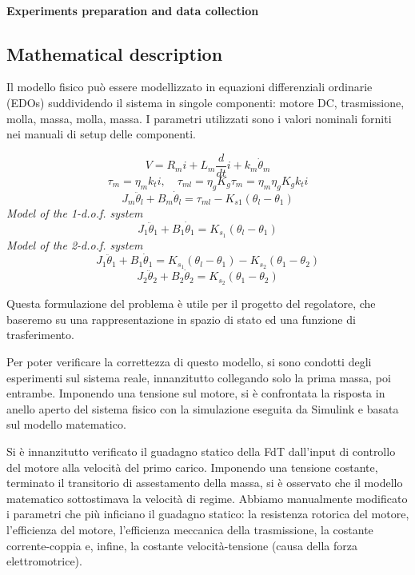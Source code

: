 \paragraph{Experiments preparation and data collection}


\subsection{Mathematical description}

Il modello fisico può essere modellizzato in equazioni differenziali ordinarie (EDOs) suddividendo il sistema in singole componenti: motore DC, trasmissione, molla, massa, molla, massa. I parametri utilizzati sono i valori nominali forniti nei manuali di setup delle componenti.


\[	V = R_m i + L_m \frac{d}{dt}i + k_m \dot{\theta}_m \]
\[ \tau_m = \eta_m k_t i , \quad \tau_{ml} = \eta_g K_g \tau_m = \eta_m \eta_g K_g k_t i \]
\[ J_m \ddot{\theta}_l + B_m \dot{\theta}_l = \tau_{ml} - K_{s1} ( \theta_l - \theta_1 ) \]
\textit{Model of the 1-d.o.f. system}
\[ J_1 \ddot{\theta}_1 + B_1 \dot{\theta}_1 = K_{s_1} ( \theta_l - \theta_1 ) \]
\textit{Model of the 2-d.o.f. system}
\\
\[ J_1 \ddot{\theta}_1 + B_1 \dot{\theta}_1 = K_{s_1} ( \theta_l - \theta_1 ) - K_{s_2} ( \theta_1 - \theta_2 ) \]
\[ J_2 \ddot{\theta}_2 + B_2 \dot{\theta}_2 = K_{s_2} ( \theta_1 - \theta_2 ) \]

Questa formulazione del problema è utile per il progetto del regolatore, che baseremo su una rappresentazione in spazio di stato ed una funzione di trasferimento.



Per poter verificare la correttezza di questo modello, si sono condotti degli esperimenti sul sistema reale, innanzitutto collegando solo la prima massa, poi entrambe.
Imponendo una tensione sul motore, si è confrontata la risposta in anello aperto del sistema fisico con la simulazione eseguita da Simulink e basata sul modello matematico.


Si è innanzitutto verificato il guadagno statico della FdT dall'input di controllo del motore alla velocità del primo carico. Imponendo una tensione costante, terminato il transitorio di assestamento della massa, si è osservato che il modello matematico sottostimava la velocità di regime.
Abbiamo manualmente modificato i parametri che più inficiano il guadagno statico: la resistenza rotorica del motore, l'efficienza del motore, l'efficienza meccanica della trasmissione, la costante corrente-coppia e, infine, la costante velocità-tensione (causa della forza elettromotrice).

